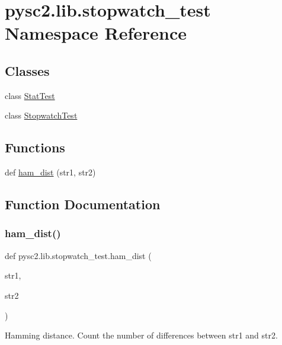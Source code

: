 \hypertarget{namespacepysc2_1_1lib_1_1stopwatch__test}{}\section{pysc2.\+lib.\+stopwatch\+\_\+test Namespace Reference}
\label{namespacepysc2_1_1lib_1_1stopwatch__test}
\subsection*{Classes}
\begin{DoxyCompactItemize}
\item 
class \mbox{\hyperlink{classpysc2_1_1lib_1_1stopwatch__test_1_1_stat_test}{Stat\+Test}}
\item 
class \mbox{\hyperlink{classpysc2_1_1lib_1_1stopwatch__test_1_1_stopwatch_test}{Stopwatch\+Test}}
\end{DoxyCompactItemize}
\subsection*{Functions}
\begin{DoxyCompactItemize}
\item 
def \mbox{\hyperlink{namespacepysc2_1_1lib_1_1stopwatch__test_aefd4dfc1051b785eb96874553b22047a}{ham\+\_\+dist}} (str1, str2)
\end{DoxyCompactItemize}


\subsection{Function Documentation}
\mbox{\label{namespacepysc2_1_1lib_1_1stopwatch__test_aefd4dfc1051b785eb96874553b22047a}} 
\subsubsection{\texorpdfstring{ham\+\_\+dist()}{ham\_dist()}}
{\footnotesize\ttfamily def pysc2.\+lib.\+stopwatch\+\_\+test.\+ham\+\_\+dist (\begin{DoxyParamCaption}\item[{}]{str1,  }\item[{}]{str2 }\end{DoxyParamCaption})}

\begin{DoxyVerb}Hamming distance. Count the number of differences between str1 and str2.\end{DoxyVerb}
 